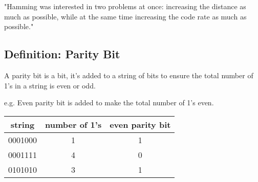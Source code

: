 \documentclass[12pt]{article}
\begin{document}
\begin{center}
  "Hamming was interested in two problems at once: increasing the distance as much as possible, while at the same time increasing the code rate as much as possible."
\end{center}

\subsection{Definition: Parity Bit}
A parity bit is a bit, it's added to a string of bits to ensure the total number of 1's in a string is even or odd. 

e.g. Even parity bit is added to make the total number of 1's even. 

\begin{center}
  \begin{tabular}{ c | c | c }
   string & number of 1's & even parity bit \\ 
   \hline
   0001000 & 1 & 1 \\  
   0001111 & 4 & 0 \\
   0101010 & 3 & 1     
  \end{tabular}
\end{center}
\end{document}
